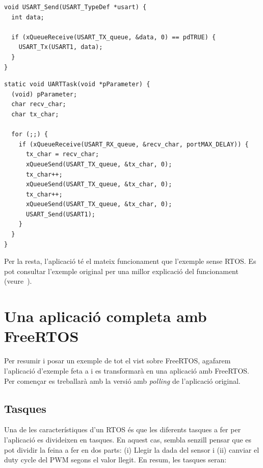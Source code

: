 \begin{lstlisting}[style=customc,caption={funció UART\_Send() per FreeRTOS}]
void USART_Send(USART_TypeDef *usart) {
  int data;

  if (xQueueReceive(USART_TX_queue, &data, 0) == pdTRUE) {
    USART_Tx(USART1, data);
  }
}
\end{lstlisting}

\begin{lstlisting}[style=customc,caption=Tasca principal de l'exemple]
static void UARTTask(void *pParameter) {
  (void) pParameter;
  char recv_char;
  char tx_char;

  for (;;) {
    if (xQueueReceive(USART_RX_queue, &recv_char, portMAX_DELAY)) {
      tx_char = recv_char;
      xQueueSend(USART_TX_queue, &tx_char, 0);
      tx_char++;
      xQueueSend(USART_TX_queue, &tx_char, 0);
      tx_char++;
      xQueueSend(USART_TX_queue, &tx_char, 0);
      USART_Send(USART1);
    }
  }
}
\end{lstlisting}


Per la resta, l'aplicació té el mateix funcionament que l'exemple sense RTOS. Es pot consultar l'exemple original per una millor explicació del funcionament (veure~).


\chapter{Una aplicació completa amb FreeRTOS}

Per resumir i posar un exemple de tot el vist sobre \gls{FreeRTOS}, agafarem l'aplicació d'exemple feta a  i es transformarà en una aplicació amb FreeRTOS. Per començar es treballarà amb la versió amb {\em polling} de l'aplicació original.

\section{Tasques}
Una de les característiques d'un \gls{RTOS} és que les diferents tasques a fer per l'aplicació es divideixen en tasques. En aquest cas, sembla senzill pensar que es pot dividir la feina a fer en dos parts: (i) Llegir la dada del sensor i (ii) canviar el \gls{duty cycle} del \gls{PWM} segons el valor llegit. En resum, les tasques seran:

